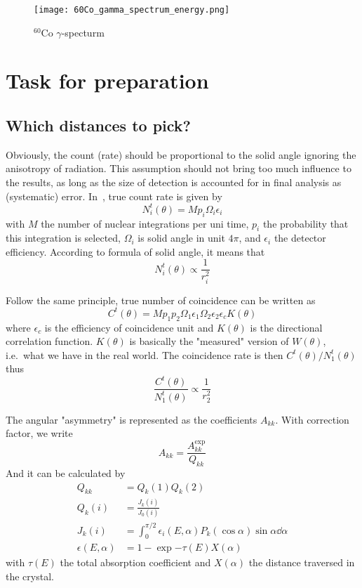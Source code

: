 \begin{figure}[ht]
   \centering
   \texttt{[image: 60Co\_gamma\_spectrum\_energy.png]}
   \caption{${}^{60}\text{Co}$ $\gamma$-specturm~\cite{CoSpec}}%
   \label{fig:CoSpec}
\end{figure}

\section{Task for preparation}
\subsection{Which distances to pick?}
Obviously, the count (rate) should be proportional to the solid angle ignoring the anisotropy of radiation. This assumption should not bring too much influence to the results, as long as the size of detection is accounted for in final analysis as (systematic) error. In~\cite{siegbahn}, true count rate is given by
\begin{equation}
   N^t_i (\theta) = M p_i \Omega_i \epsilon_i
\end{equation}
with $M$ the number of nuclear integrations per uni time, $p_i$ the probability that this integration is selected, $\Omega_i$ is solid angle in unit $4\pi$, and $\epsilon_i$ the detector efficiency. According to formula of solid angle, it means that
\begin{equation}
   N^t_i (\theta) \propto \frac{1}{r_i^2}
\end{equation}

Follow the same principle, true number of coincidence can be written as~\cite{siegbahn}
\begin{equation}
   C^t(\theta) = M p_1 p_2 \Omega_1 \epsilon_1 \Omega_2 \epsilon_2 \epsilon_c K(\theta)
\end{equation}
where $\epsilon_c$ is the efficiency of coincidence unit and $K(\theta)$ is the directional correlation function. $K(\theta)$ is basically the "measured" version of $W(\theta)$, i.e.~what we have in the real world. 
The coincidence rate is then $C^t(\theta)/ N_1^t(\theta)$ thus 
\begin{equation}
   \frac{C^t(\theta)}{N_1^t(\theta)} \propto \frac{1}{r_2^2}
\end{equation}

The angular "asymmetry" is represented as the coefficients $A_{kk}$. With correction factor, we write
\begin{equation}
   A_{kk} = \frac{A_{kk}^\text{exp}}{Q_{kk}}
\end{equation}
And it can be calculated by~\cite{siegbahn}
\begin{align}
   Q_{kk} &= Q_k(1) Q_k(2) \\
   Q_k(i) &= \frac{J_k(i)}{J_0(i)} \\
   J_k(i) &= \int_0^{\pi/2} \epsilon_i (E,\alpha) P_k (\cos\alpha) \sin \alpha \dd{\alpha} \\
   \epsilon(E,\alpha) &= 1 - \exp{- \tau (E) X(\alpha)}
\end{align}
with $\tau (E)$ the total absorption coefficient and $X(\alpha)$ the distance traversed in the crystal.

